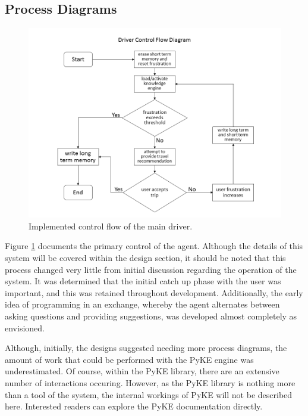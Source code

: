 \documentclass[11pt]{article} %
\begin{document}
\subsection{Process Diagrams}
\begin{figure}
\centering
\includegraphics[width=12cm]{driver_control_flow.png}
\caption{Implemented control flow of the main driver.\label{fig:driver}}
\end{figure}

Figure \ref{fig:driver} documents the primary control of the agent. Although the details of this system will be covered within the design section, it should be noted that this process changed very little from initial discussion regarding the operation of the system. It was determined that the initial catch up phase with the user was important, and this was retained throughout development. Additionally, the early idea of programming in an exchange, whereby the agent alternates between asking questions and providing suggestions, was developed almost completely as envisioned.

Although, initially, the designs suggested needing more process diagrams, the amount of work that could be performed with the PyKE engine was underestimated. Of course, within the PyKE library, there are an extensive number of interactions occuring. However, as the PyKE library is nothing more than a tool of the system, the internal workings of PyKE will not be described here. Interested readers can explore the PyKE documentation directly\cite{pyke}.
\end{document}
